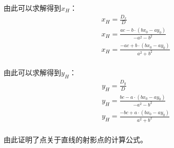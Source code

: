 \documentclass[UTF8]{ctexart}
\begin{document}
    由此可以求解得到$x_H$：
    \begin{align}
        &x_H=\frac{D_x}{D}\\[3mm]
        &x_H=\frac{ac-b\cdot(bx_0-ay_0)}{-a^2-b^2}\\[3mm]
        &x_H=\frac{-ac+b\cdot(bx_0-ay_0)}{a^2+b^2}
    \end{align}\\
    由此可以求解得到$y_H$：
    \begin{align}
        &y_H=\frac{D_y}{D}\\[3mm]
        &y_H=\frac{bc-a\cdot(bx_0-ay_0)}{-a^2-b^2}\\[3mm]
        &y_H=\frac{-bc+a\cdot(bx_0-ay_0)}{a^2+b^2}
    \end{align}\\
    由此证明了点关于直线的射影点的计算公式。

\newpage
\end{document}
